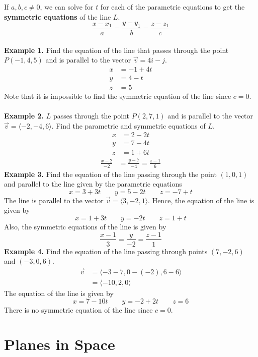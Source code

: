 \documentclass{report}
\begin{document}
If $a, b, c \neq 0$, we can solve for $t$ for each of the parametric equations
to get the \textbf{symmetric equations} of the line $L$. \[\frac{x - x_1}{a} = \frac{y - y_1}{b} = \frac{z - z_1}{c}\]
~\\
\noindent\textbf{Example 1. } Find the equation of the line that passes through the point $P(-1, 4, 5)$ and is parallel to the vector $\vec{v} = 4i - j$.
\begin{align*}
    x & = -1 + 4t \\
    y & = 4 - t   \\
    z & = 5
\end{align*}
Note that it is impossible to find the symmetric equation of the line since $c = 0$.
~\\\\
\noindent\textbf{Example 2. } $L$ passes through the point $P(2, 7, 1)$ and is parallel to the vector $\vec{v} = \langle -2, -4, 6 \rangle$. Find the parametric and symmetric equations of $L$.
\begin{align*}
    x & = 2 - 2t \\
    y & = 7 - 4t \\
    z & = 1 + 6t
\end{align*}
\begin{align*}
    \frac{x - 2}{-2} & = \frac{y - 7}{-4} = \frac{z - 1}{6}
\end{align*}
\noindent\textbf{Example 3. } Find the equation of the line passing through the point $(1, 0, 1)$ and parallel to the line given by the parametric equations \[x = 3 + 3t \qquad y = 5 - 2t \qquad z = -7 + t\]
The line is parallel to the vector $\vec{v} = \langle 3, -2, 1 \rangle$. Hence,
the equation of the line is given by \[x = 1 + 3t \qquad y = -2t \qquad z = 1 + t\]
Also, the symmetric equations of the line is given by \[\frac{x - 1}{3} = \frac{y}{-2} = \frac{z - 1}{1}\]
\noindent\textbf{Example 4. } Find the equation of the line passing through points $(7, -2, 6)$ and $(-3, 0, 6)$.
\begin{align*}
    \vec{v} & = \langle -3 - 7, 0 - (-2), 6 - 6 \rangle \\
            & = \langle -10, 2, 0 \rangle
\end{align*}
The equation of the line is given by \[x = 7 - 10t \qquad y = -2 + 2t \qquad z = 6\]
There is no symmetric equation of the line since $c = 0$.

\chapter{Planes in Space}
\end{document}
